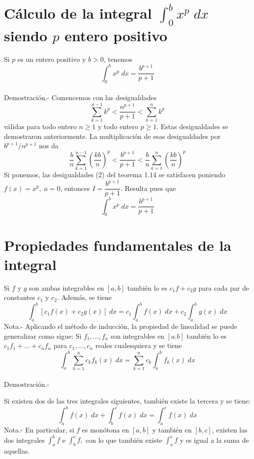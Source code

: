 \section{Cálculo de la integral $\int_0^b x^p \; dx$ siendo $p$ entero positivo}

\begin{teo} Si $p$ es un entero positivo y $b>0$, tenemos $$\int_0^b x^p \; dx = \dfrac{b^{p+1}}{p+1}$$\\
    Demostración.-\; Comencemos con las desigualdades $$\sum\limits_{k=1}^{n-1} k^p < \dfrac{n^{p+1}}{p+1}<\sum\limits_{k=1}^n k^p$$
    válidas para todo entero $n\geq 1$ y todo entero $p\geq 1$. Estas desigualdades se demostraron anteriormente. La multiplicación de esas desigualdades por $b^{p+1}/n^{p+1}$ nos da $$\dfrac{b}{n} \sum\limits_{k=1}^{n-1} \left(\dfrac{kb}{n}\right)^p<\dfrac{b^{p+1}}{p+1}<\dfrac{b}{n}\sum\limits_{k=1}^{n}\left(\dfrac{kb}{n}\right)^p$$
    Si ponemos, las desigualdades (2) del teorema 1.14 se satisfacen poniendo $f(x)=x^p, \;a=0$, entonces $I=\dfrac{b^{p+1}}{p+1}$. Resulta pues que $$\int_0^b x^p \; dx=\dfrac{b^{p+1}}{p+1}$$
\end{teo}


\section{Propiedades fundamentales de la integral}

\begin{teo} Si $f$ y $g$ son ambas integrables en $[a,b]$ también lo es $c_1f+c_2g$ para cada par de constantes $c_1$ y $c_2$. Además, se tiene
    $$\int_a^b \left[c_1 f(x) + c_2g(x)\right]\; dx = c_1\int_a^b f(x) \; dx + c_2 \int_a^b g(x) \; dx$$
    Nota.- \; Aplicando el método de inducción, la propiedad de linealidad se puede generalizar como sigue: Si $f_1,...,f_n$ son integrables en $[a.b]$ también lo es $c_1f_1+...+c_nf_n$ para $c_1,...,c_n$ reales cualesquiera y se tiene $$\int_a^b \sum\limits_{k=1}^n c_kf_k(x)\; dx = \sum\limits_{k=1}^n c_k \int_a^b f_k(x)\; dx$$\\

    Demostración.-\;
\end{teo}

\begin{teo} Si existen dos de las tres integrales siguientes, también existe la tercera y se tiene: $$\int_a^b f(x) \; dx + \int_b^c f(x) \; dx = \int_a^c f(x) \; dx$$
    Nota.- \; En particular, si $f$ es monótona en $[a,b]$ y también en $[b,c]$, existen las dos integrales $\int_a^b f$ e $\int_b^c f,$ con lo que también existe $\int_a^c f$ y es igual a la suma de aquellas.\\\\
\end{teo}

